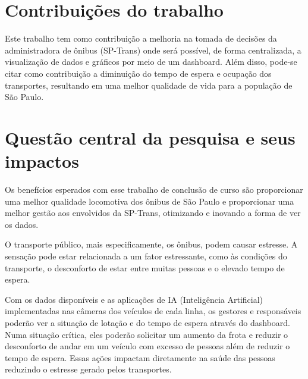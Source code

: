 \section{Contribuições do trabalho}
\indent
\par Este trabalho tem como contribuição a melhoria na tomada de decisões da administradora de ônibus (SP-Trans) onde será possível, de forma centralizada, a visualização de dados e gráficos por meio de um dashboard. Além disso, pode-se citar como contribuição a diminuição do tempo de espera e ocupação dos transportes, resultando em uma melhor qualidade de vida para a população de São Paulo.

\section{Questão central da pesquisa e seus impactos}
\indent
\par Os benefícios esperados com esse trabalho de conclusão de curso são proporcionar uma melhor qualidade locomotiva dos ônibus de São Paulo e proporcionar uma melhor gestão aos envolvidos da SP-Trans, otimizando e inovando a forma de ver os dados.

\indent
\par O transporte público, mais especificamente, os ônibus, podem causar estresse. A sensação pode estar relacionada a um fator estressante, como às condições do transporte, o desconforto de estar entre muitas pessoas e o elevado tempo de espera.
\par Com os dados disponíveis e as aplicações de IA (Inteligência Artificial) implementadas nas câmeras dos veículos de cada linha, os gestores e responsáveis poderão ver a situação de lotação e do tempo de espera através do dashboard. Numa situação crítica, eles poderão solicitar um aumento da frota e reduzir o desconforto de andar em um veículo com excesso de pessoas além de reduzir o tempo de espera. Essas ações impactam diretamente na saúde das pessoas reduzindo o estresse gerado pelos transportes.
